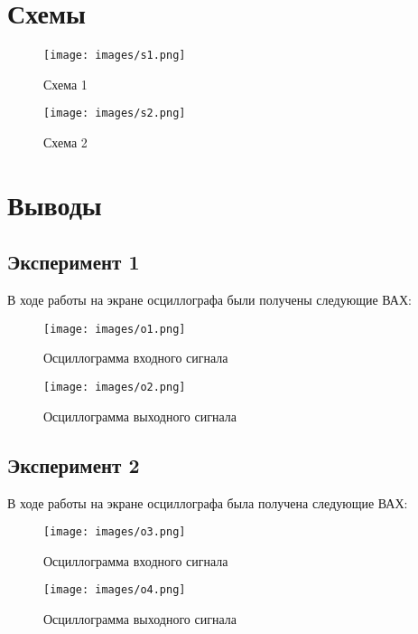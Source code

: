 \documentclass[12pt]{article}
\begin{document}
    \newpage

    \section*{Схемы}

    \begin{figure}[ht]
        \centering
        \texttt{[image: images/s1.png]}
        \caption{Схема 1}
        \label{fig:s:1}
    \end{figure}

    \begin{figure}[ht]
        \centering
        \texttt{[image: images/s2.png]}
        \caption{Схема 2}
        \label{fig:s:2}
    \end{figure}

    \newpage

    \section*{Выводы}

    \subsection*{Эксперимент 1}

    В ходе работы на экране осциллографа были получены следующие ВАХ:

    \begin{figure}[ht]
        \centering
        \texttt{[image: images/o1.png]}
        \caption{ Осциллограмма входного сигнала}
        \label{fig:o:1}
    \end{figure}

    \begin{figure}[ht]
        \centering
        \texttt{[image: images/o2.png]}
        \caption{Осциллограмма выходного сигнала}
        \label{fig:o:2}
    \end{figure}

    \newpage

    \subsection*{Эксперимент 2}

    В ходе работы на экране осциллографа была получена следующие ВАХ:

    \begin{figure}[ht]
        \centering
        \texttt{[image: images/o3.png]}
        \caption{Осциллограмма входного сигнала}
        \label{fig:o:3}
    \end{figure}

    \begin{figure}[ht]
        \centering
        \texttt{[image: images/o4.png]}
        \caption{Осциллограмма выходного сигнала}
        \label{fig:o:4}
    \end{figure}
\end{document}
